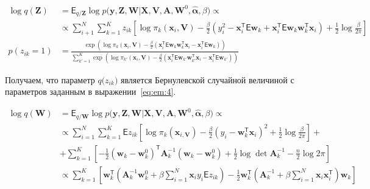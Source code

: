 \documentclass[12pt, twoside]{article}
\numberwithin{equation}{section}
\begin{document}
\begin{equation}
\label{eq:em:4}
\begin{aligned}
\log q\left(\textbf{Z}\right) &= \mathsf{E}_{q/\textbf{Z}} \log p\bigr(\mathbf{y}, \mathbf{Z}, \mathbf{W}|\mathbf{X}, \mathbf{V}, \textbf{A}, \textbf{W}^{0}, \hat{\bm{\alpha}}, \beta\bigr)  \propto\\
&\propto \sum_{i+1}^{N}\sum_{k=1}^{K}z_{ik}\left[\log\pi_{k}\left(\textbf{x}_{i}, \textbf{V}\right) - \frac{\beta}{2}\left(y_{i}^{2} -\textbf{x}_{i}^{\mathsf{T}}\mathsf{E}\textbf{w}_{k} + \textbf{x}_{i}^{\mathsf{T}}\mathsf{E}\textbf{w}_{k}\textbf{w}_{k}^{\mathsf{T}}\textbf{x}_{i}\right) + \frac{1}{2}\log\frac{\beta}{2\pi}\right]\\
p\left(z_{ik} = 1\right) &= \frac{\exp\left(\log\pi_{k}\left(\textbf{x}_{i}, \textbf{V}\right) - \frac{\beta}{2}\left(\textbf{x}_{i}^{\mathsf{T}}\mathsf{E}\textbf{w}_{k}\textbf{w}_{k}^{\mathsf{T}}\textbf{x}_{i} - \textbf{x}_{i}^{\mathsf{T}}\mathsf{E}\textbf{w}_{k}\right)\right)}{\sum_{k'=1}^{K}\exp\left(\log\pi_{k'}\left(\textbf{x}_{i}, \textbf{V}\right) - \frac{\beta}{2}\left(\textbf{x}_{i}^{\mathsf{T}}\mathsf{E}\textbf{w}_{k'}\textbf{w}_{k'}^{\mathsf{T}}\textbf{x}_{i} - \textbf{x}_{i}^{\mathsf{T}}\mathsf{E}\textbf{w}_{k'}\right) \right)}
\end{aligned}
\end{equation}

Получаем, что параметр $q\bigr(z_{ik}\bigr)$ является Бернулевской случайной величиной с параметров заданным в выражении~\eqref{eq:em:4}.

\begin{equation}
\label{eq:em:5}
\begin{aligned}
\log q\left(\textbf{W}\right) &= \mathsf{E}_{q/\textbf{W}}\log p\bigr(\mathbf{y}, \mathbf{Z}, \mathbf{W}|\mathbf{X}, \mathbf{V}, \textbf{A}, \textbf{W}^{0}, \hat{\bm{\alpha}}, \beta\bigr) \propto\\
&\propto \sum_{i=1}^{N}\sum_{k=1}^{K}\mathsf{E}z_{ik}\left[\log\pi_{k}\left(\textbf{x}_{i, \textbf{V}}\right) - \frac{\beta}{2}\left(y_{i} - \textbf{w}_{k}^{\mathsf{T}}\textbf{x}_{i}\right)^{2} + \frac{1}{2}\log\frac{\beta}{2\pi}\right] + \\
&+ \sum_{k=1}^{K}\left[-\frac{1}{2}\left(\textbf{w}_{k} - \textbf{w}_{k}^{0}\right)^{\mathsf{T}}\textbf{A}_{k}^{-1}\left(\textbf{w}_{k} - \textbf{w}_{k}^{0}\right) + \frac{1}{2}\log\det\textbf{A}^{-1}_{k} - \frac{n}{2}\log2\pi\right] \\
&\propto \sum_{k=1}^{K}\left[\textbf{w}_{k}^{\mathsf{T}}\left(\textbf{A}_{k}^{-1}\textbf{w}_{k}^{0}+\beta\sum_{i=1}^{N}\textbf{x}_{i}y_{i}\mathsf{E}z_{ik}\right)-\frac{1}{2}\textbf{w}_{k}^{\mathsf{T}}\left(\textbf{A}_{k}^{-1}+\beta\sum_{i=1}^{N}\textbf{x}_{i}\textbf{x}_{i}^{\mathsf{T}}\right)\textbf{w}_{k}\right]
\end{aligned}
\end{equation}
\end{document}
